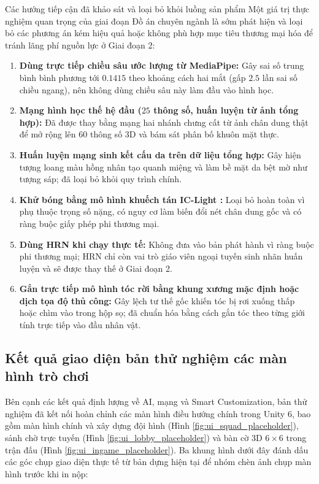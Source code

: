 \begin{notebox}{Các hướng tiếp cận đã khảo sát và loại bỏ khỏi luồng sản phẩm}
Một giá trị thực nghiệm quan trọng của giai đoạn Đồ án chuyên ngành là sớm phát hiện và loại bỏ các phương án kém hiệu quả hoặc không phù hợp mục tiêu thương mại hóa để tránh lãng phí nguồn lực ở Giai đoạn 2:
\begin{enumerate}
    \item \textbf{Dùng trực tiếp chiều sâu ước lượng từ MediaPipe:} Gây sai số trung bình bình phương tới $0.1415$ theo khoảng cách hai mắt (gấp $2.5$ lần sai số chiều ngang), nên không dùng chiều sâu này làm đầu vào hình học.
    \item \textbf{Mạng hình học thế hệ đầu ($25$ thông số, huấn luyện từ ảnh tổng hợp):} Đã được thay bằng mạng hai nhánh chưng cất từ ảnh chân dung thật để mở rộng lên $60$ thông số 3D và bám sát phân bố khuôn mặt thực.
    \item \textbf{Huấn luyện mạng sinh kết cấu da trên dữ liệu tổng hợp:} Gây hiện tượng loang màu hồng nhân tạo quanh miệng và làm bề mặt da bệt mờ như tượng sáp; đã loại bỏ khỏi quy trình chính.
    \item \textbf{Khử bóng bằng mô hình khuếch tán IC-Light \cite{iclight}:} Loại bỏ hoàn toàn vì phụ thuộc trọng số nặng, có nguy cơ làm biến đổi nét chân dung gốc và có ràng buộc giấy phép phi thương mại.
    \item \textbf{Dùng HRN \cite{hrn} khi chạy thực tế:} Không đưa vào bản phát hành vì ràng buộc phi thương mại; HRN chỉ còn vai trò giáo viên ngoại tuyến sinh nhãn huấn luyện và sẽ được thay thế ở Giai đoạn 2.
    \item \textbf{Gắn trực tiếp mô hình tóc rời bằng khung xương mặc định hoặc dịch tọa độ thủ công:} Gây lệch tư thế gốc khiến tóc bị rơi xuống thấp hoặc chìm vào trong hộp sọ; đã chuẩn hóa bằng cách gắn tóc theo từng giới tính trực tiếp vào đầu nhân vật.
\end{enumerate}
\end{notebox}

\subsection{Kết quả giao diện bản thử nghiệm các màn hình trò chơi}
Bên cạnh các kết quả định lượng về AI, mạng và Smart Customization, bản thử nghiệm đã kết nối hoàn chỉnh các màn hình điều hướng chính trong Unity 6, bao gồm màn hình chính và xây dựng đội hình (Hình \ref{fig:ui_squad_placeholder}), sảnh chờ trực tuyến (Hình \ref{fig:ui_lobby_placeholder}) và bàn cờ 3D $6 \times 6$ trong trận đấu (Hình \ref{fig:ui_ingame_placeholder}). Ba khung hình dưới đây đánh dấu các góc chụp giao diện thực tế từ bản dựng hiện tại để nhóm chèn ảnh chụp màn hình trước khi in nộp:

